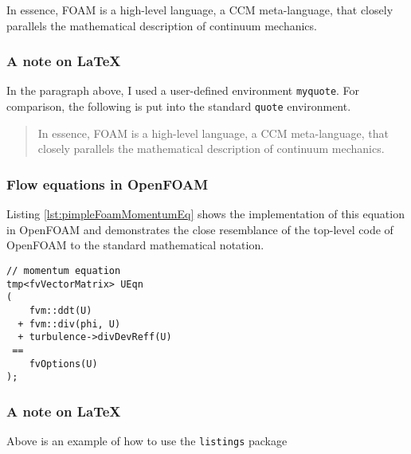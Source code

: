 \begin{myquote}
In essence, \acs{FOAM} is a high-level language, a \acs{CCM} meta-language, that closely parallels 
the mathematical description of continuum mechanics.
\end{myquote}


\subsubsection*{A note on \LaTeX{}}

In the paragraph above, I used a user-defined environment \verb+myquote+. For comparison, 
the following is put into the standard \verb+quote+ environment.

\begin{quote}
In essence, \acs{FOAM} is a high-level language, a \acs{CCM} meta-language, that closely parallels 
the mathematical description of continuum mechanics.
\end{quote}





\subsubsection{Flow equations in OpenFOAM}

Listing \ref{lst:pimpleFoamMomentumEq} shows the implementation of this equation in OpenFOAM and demonstrates the 
close resemblance of the top-level code of OpenFOAM to the standard mathematical notation.

\begin{lstlisting}[escapechar=§,style=cppStyle,caption={The momentum equation of the transient incompressible 
	solver \emph{pimpleFoam}.},label=lst:pimpleFoamMomentumEq] 
// momentum equation
tmp<fvVectorMatrix> UEqn
(
    fvm::ddt(U)
  + fvm::div(phi, U)
  + turbulence->divDevReff(U)
 ==
    fvOptions(U)
);
\end{lstlisting}

\subsubsection*{A note on \LaTeX{}}

Above is an example of how to use the \verb+listings+ package





